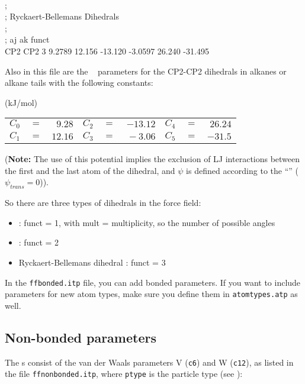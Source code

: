 \begin{tt}
[ dihedraltypes ] \\
;\\
; Ryckaert-Bellemans Dihedrals\\
;\\
; aj    ak      funct\\
CP2     CP2     3       9.2789  12.156  -13.120 -3.0597 26.240  -31.495\\
\end{tt}

Also in this file are the
~\cite{Ryckaert78} parameters for the
CP2-CP2 dihedrals in alkanes or alkane tails with the following
constants:

\begin{center}
(kJ/mol)\\
\begin{tabular}{llrllrllr}
$C_0$ & $=$ & $~ 9.28$ & $C_2$ & $=$ & $-13.12$ & $C_4$ & $=$ & $ 26.24$ \\
$C_1$ & $=$ & $ 12.16$ & $C_3$ & $=$ & $~-3.06$ & $C_5$ & $=$ & $-31.5 $ \\
\end{tabular}
\end{center}

({\bf Note:} The use of this potential implies the exclusion of LJ interactions
between the first and the last atom of the dihedral, and $\psi$ is defined
according to the ``'' ($\psi_{trans}=0$)).

So there are three types of dihedrals in the {\gromacs} force field:
\begin{itemize}
\item {} : funct = 1, with mult = multiplicity, so the
                                   number of possible angles
\item {} : funct = 2
\item Ryckaert-Bellemans dihedral : funct = 3
\end{itemize}
In the {\tt ffbonded.itp} file, you can add bonded parameters. If you
want to include parameters for new atom types, make sure you define
them in {\tt atomtypes.atp} as well.

\subsection{Non-bonded parameters}
\label{subsec:nbpar}
The s consist of the van der Waals parameters
V ({\tt c6}) and W ({\tt c12}), as listed in the file {\tt ffnonbonded.itp},
where {\tt ptype} is the particle type (see ):


